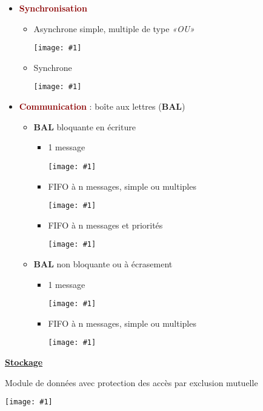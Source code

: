 \documentclass{article}
\newcommand{\dred}[1]{\textcolor{darkred}{\textbf{#1}}}
\newcommand{\imgR}[2]{\begin{center}\texttt{[image: \#1]}\end{center}}
\newcommand{\stitre}[1]{\noindent\textbf{\underline{#1}} \\}
\begin{document}
\begin{itemize}
\item \dred{Synchronisation}
	\begin{itemize}
	\item \begin{multicols}{2}
		Asynchrone simple, multiple de type \textit{«OU»}
		\imgR{img/ITR_015.png}{110}
		\end{multicols}
	\item \begin{multicols}{2}
		Synchrone
		\imgR{img/ITR_016.png}{50}
		\end{multicols}
	\end{itemize}
\item \dred{Communication} : boîte aux lettres (\textbf{BAL})
	\begin{itemize}
	\item \textbf{BAL} bloquante en écriture
		\begin{itemize}
		\item \begin{multicols}{2}
			1 message
			\imgR{img/ITR_017.png}{50}
			\end{multicols}
		\item \begin{multicols}{2}
			FIFO à n messages, simple ou multiples
			\imgR{img/ITR_018.png}{100}
			\end{multicols}
		\item \begin{multicols}{2}
			FIFO à n messages et priorités
			\imgR{img/ITR_019.png}{50}
			\end{multicols}
		\end{itemize}
	\item \textbf{BAL} non bloquante ou à écrasement
		\begin{itemize}
		\item \begin{multicols}{2}
			1 message
			\imgR{img/ITR_020.png}{50}
			\end{multicols}
		\item \begin{multicols}{2}
			FIFO à n messages, simple ou multiples
			\imgR{img/ITR_021.png}{100}
			\end{multicols}
		\end{itemize}	
	\end{itemize}
\end{itemize}

\stitre{Stockage}

\begin{multicols}{2}
Module de données avec protection des accès par exclusion mutuelle
\imgR{img/ITR_022.png}{200}
\end{multicols}
\end{document}
